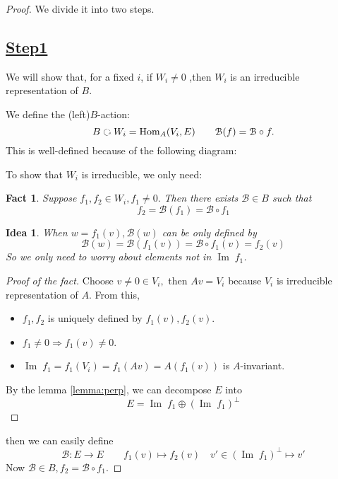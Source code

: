 \documentclass[11pt,oneside]{amsart}
\numberwithin{equation}{section}
\theoremstyle{plain}
\newtheorem*{fact}{Fact}
\newtheorem*{idea}{Idea}
\theoremstyle{plain}
\numberwithin{equation}{section}
\theoremstyle{remark}
\newcommand{\exist}{ there exists }
\newcommand{\st}{ such that }
\newcommand{\Hom}{\operatorname{Hom}}
\newcommand{\im}{\operatorname{Im}\;}
\begin{document}
	\begin{proof}
		We divide it into two steps.
		\subsection*{\underline{Step1}}
		We will show that, for a fixed $i$, if $W_i\neq 0$ ,then $W_i$ is an irreducible representation of $B$.
	
		We define the (left)$B$-action:
		$$B \text{ \rotatebox[origin=c]{270}{$\circlearrowleft$} } W_i=\Hom_A (V_i,E) \qquad \mathcal{B}(f)=\mathcal{B} \circ f.$$
		This is well-defined because of the following diagram:
		\begin{center}
		\end{center}
		 To show that $W_i$ is irreducible, we only need:
		 \begin{fact}
		 	Suppose $f_1,f_2 \in W_i, f_1\neq 0.$ Then \exist $\mathcal{B} \in B$ \st 
		 	$$f_2=\mathcal{B}(f_1)=\mathcal{B} \circ f_1$$
		 \end{fact}
	 \begin{idea}
	 	When $w=f_1(v), \mathcal{B}(w)$ can be only defined by
	 	$$\mathcal{B}(w)=\mathcal{B}(f_1(v)) = \mathcal{B} \circ f_1(v)=f_2(v)$$
	 	So we only need to worry about elements not in $\im f_1$.
	 \end{idea}
 \begin{proof}[Proof of the fact]
 	Choose $v\neq 0 \in V_i,$ then $Av=V_i$ because $V_i$ is irreducible representation of $A$. From this,
 	\begin{itemize}
 		\item $f_1,f_2$ is uniquely defined by $f_1(v), f_2(v)$.
 		\item $f_1 \neq 0 \Longrightarrow f_1(v) \neq 0$.
 		\item $\im f_1=f_1(V_i)=f_1(Av)=A(f_1(v))$ is $A$-invariant.
 	\end{itemize}
 By the lemma \ref{lemma:perp}, we can decompose $E$ into
 $$E=\im f_1 \oplus (\im f_1)^{\perp}$$
 \end{proof}
then we can easily define
$$\mathcal{B}:E \longrightarrow E \qquad f_1(v) \longmapsto f_2(v) \quad v' \in (\im f_1)^{\perp} \longmapsto v'$$
Now $\mathcal{B} \in B, f_2=\mathcal{B} \circ f_1$.

\end{proof}
\end{document}
